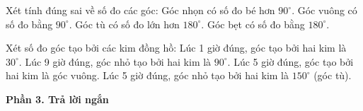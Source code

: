 \begin{ex} %
Xét tính đúng sai về số đo các góc:
\choiceTF
{\True Góc nhọn có số đo bé hơn $90^\circ$.}
{\True Góc vuông có số đo bằng $90^\circ$.}
{Góc tù có số đo lớn hơn $180^\circ$.}
{\True Góc bẹt có số đo bằng $180^\circ$.}
\end{ex}

\begin{ex} %
Xét số đo góc tạo bởi các kim đồng hồ:
\choiceTF
{\True Lúc 1 giờ đúng, góc tạo bởi hai kim là $30^\circ$.}
{\True Lúc 9 giờ đúng, góc nhỏ tạo bởi hai kim là $90^\circ$.}
{Lúc 5 giờ đúng, góc tạo bởi hai kim là góc vuông.}
{\True Lúc 5 giờ đúng, góc nhỏ tạo bởi hai kim là $150^\circ$ (góc tù).}
\end{ex}

\textbf{Phần 3. Trả lời ngắn}

